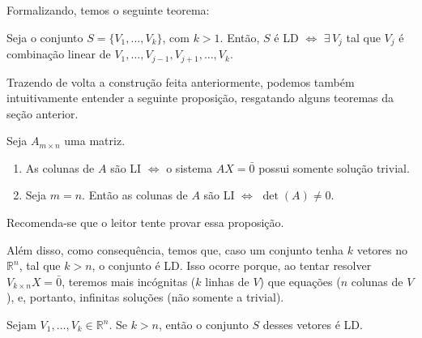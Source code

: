 \documentclass[../main.tex]{subfiles}
\begin{document}
		Formalizando, temos o seguinte teorema:
		\begin{teorema}
			Seja o conjunto $S=\{V_1,\dots,V_k\}$, com $k>1$. Então, $S$ é LD $\Leftrightarrow$ $\exists\, V_j$ tal que $V_j$ é combinação linear de $V_1,\dots,V_{j-1},V_{j+1},\dots,V_k$.
		\end{teorema}
		
		Trazendo de volta a construção feita anteriormente, podemos também intuitivamente entender a seguinte proposição, resgatando alguns teoremas da seção anterior.
		\begin{proposicao}
			Seja $A_{m\times n}$ uma matriz.
			\begin{enumerate}[label=\roman*)]
				\item As colunas de $A$ são LI $\Leftrightarrow$ o sistema $AX=\bar{0}$ possui somente solução trivial.
				\item Seja $m=n$. Então as colunas de $A$ são LI $\Leftrightarrow$ $\det(A)\neq 0$.
			\end{enumerate} 
		\end{proposicao}
		Recomenda-se que o leitor tente provar essa proposição.
		
		Além disso, como consequência, temos que, caso um conjunto tenha $k$ vetores no $\mathbb{R}^n$, tal que $k>n$, o conjunto é LD. Isso ocorre porque, ao tentar resolver $V_{k\times n}X=\bar{0}$, teremos mais incógnitas ($k$ linhas de $V$) que equações ($n$ colunas de $V$), e, portanto, infinitas soluções (não somente a trivial).
		\begin{corolario}
			Sejam $V_1,\dots, V_k\in\mathbb{R}^n$. Se $k>n$, então o conjunto $S$ desses vetores é LD.
		\end{corolario}
		
		
\end{document}
